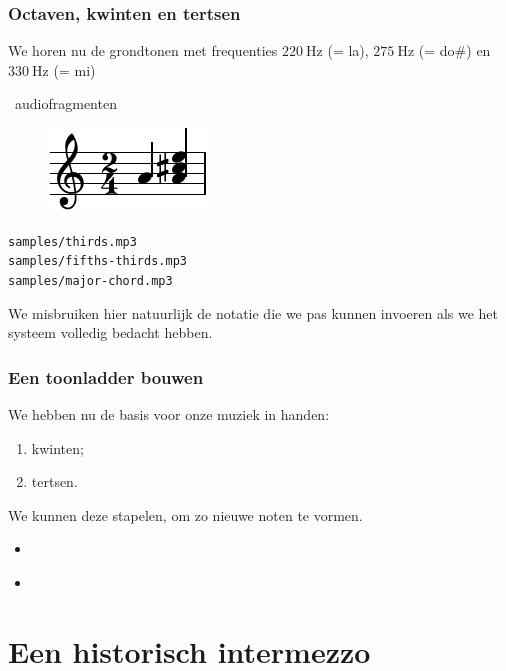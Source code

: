 \documentclass[compress, darktitle, framenumber, totalframenumber, handout]{beamer}
\begin{document}
\begin{frame}
  \frametitle{Octaven, kwinten en tertsen}

  We horen nu de grondtonen met frequenties $\SI{220}{\hertz}$ (= la), $\SI{275}{\hertz}$ (= do\#) en $\SI{330}{\hertz}$ (= mi)
  \begin{block}{\twonotes\ audiofragmenten}
    \begin{figure}
      \vspace{-.5cm} %
      \centering
      \includegraphics{scores/major-chord-cropped}
    \end{figure}

    \texttt{samples/thirds.mp3} \\
    \texttt{samples/fifths-thirds.mp3} \\
    \texttt{samples/major-chord.mp3}
  \end{block}

  \pause

  We misbruiken hier natuurlijk de notatie die we pas kunnen invoeren als we het systeem volledig bedacht hebben.
\end{frame}

\begin{frame}
  \frametitle{Een toonladder bouwen}

  We hebben nu de basis voor onze muziek in handen:
  \begin{enumerate}
    \item kwinten;
    \item tertsen.
  \end{enumerate}
  We kunnen deze stapelen, om zo nieuwe noten te vormen.
  \pause
  \begin{itemize}
    \item {}
    \item \hyperlink{tunings}{}
  \end{itemize}
\end{frame}


\section{Een historisch intermezzo}
\end{document}

